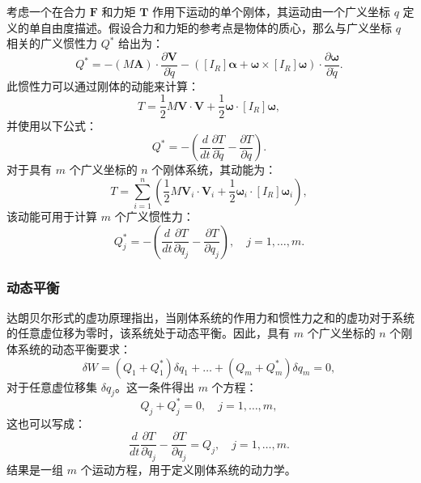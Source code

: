 考虑一个在合力 \( \mathbf{F} \) 和力矩 \( \mathbf{T} \) 作用下运动的单个刚体，其运动由一个广义坐标 \( q \) 定义的单自由度描述。假设合力和力矩的参考点是物体的质心，那么与广义坐标 \( q \) 相关的广义惯性力 \( Q^* \) 给出为：
\[
Q^* = - (M \mathbf{A}) \cdot \frac{\partial \mathbf{V}}{\partial \dot{q}} - \left( [I_R] \boldsymbol{\alpha} + \boldsymbol{\omega} \times [I_R] \boldsymbol{\omega} \right) \cdot \frac{\partial \boldsymbol{\omega}}{\partial \dot{q}}.~
\]
此惯性力可以通过刚体的动能来计算：
\[
T = \frac{1}{2} M \mathbf{V} \cdot \mathbf{V} + \frac{1}{2} \boldsymbol{\omega} \cdot [I_R] \boldsymbol{\omega},~
\]
并使用以下公式：
\[
Q^* = - \left( \frac{d}{dt} \frac{\partial T}{\partial \dot{q}} - \frac{\partial T}{\partial q} \right).~
\]
对于具有 \( m \) 个广义坐标的 \( n \) 个刚体系统，其动能为：
\[
T = \sum_{i=1}^{n} \left( \frac{1}{2} M \mathbf{V}_i \cdot \mathbf{V}_i + \frac{1}{2} \boldsymbol{\omega}_i \cdot [I_R] \boldsymbol{\omega}_i \right),~
\]
该动能可用于计算 \( m \) 个广义惯性力：
\[
Q_j^* = - \left( \frac{d}{dt} \frac{\partial T}{\partial \dot{q}_j} - \frac{\partial T}{\partial q_j} \right), \quad j = 1, \dots, m.~
\]
\subsubsection{动态平衡}
达朗贝尔形式的虚功原理指出，当刚体系统的作用力和惯性力之和的虚功对于系统的任意虚位移为零时，该系统处于动态平衡。因此，具有 \( m \) 个广义坐标的 \( n \) 个刚体系统的动态平衡要求：
\[
\delta W = \left(Q_{1} + Q_{1}^{*}\right) \delta q_{1} + \dots + \left(Q_{m} + Q_{m}^{*}\right) \delta q_{m} = 0,~
\]
对于任意虚位移集 \( \delta q_j \)。这一条件得出 \( m \) 个方程：
\[
Q_j + Q_j^* = 0, \quad j = 1, \dots, m,~
\]
这也可以写成：
\[
\frac{d}{dt} \frac{\partial T}{\partial \dot{q}_j} - \frac{\partial T}{\partial q_j} = Q_j, \quad j = 1, \dots, m.~
\]
结果是一组 \( m \) 个运动方程，用于定义刚体系统的动力学。